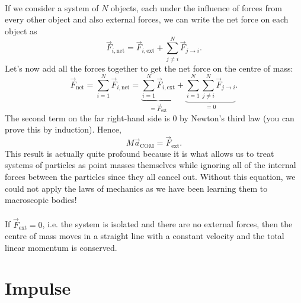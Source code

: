 \documentclass[../classical_mechanics.tex]{subfiles}
\begin{document}
        \paragraph{}
        If we consider a system of $N$ objects, each under the influence of forces from every other object and also external forces, we can write the net force on each object as
        \begin{equation}
            \vec{F}_{i,\text{net}}=\vec{F}_{i,\text{ext}}+\sum_{j\neq i}^N\vec{F}_{j\to i}.
        \end{equation}
        Let's now add all the forces together to get the net force on the centre of mass:
        \begin{equation}
            \vec{F}_\text{net} = \sum_{i=1}^N\vec{F}_{i,\text{net}} = \underbrace{\sum_{i=1}^N\vec{F}_{i,\text{ext}}}_{=\vec{F}_\text{ext}}+\underbrace{\sum_{i=1}^N\sum_{j\neq i}^N\vec{F}_{j\to i}}_{=0}.
        \end{equation}
        The second term on the far right-hand side is 0 by Newton's third law (you can prove this by induction).
        Hence,
        \begin{equation}\label{eq-NII-macroscopic}
            M\vec{a}_\text{COM}=\vec{F}_\text{ext}.
        \end{equation}
        This result is actually quite profound because it is what allows us to treat systems of particles as point masses themselves while ignoring all of the internal forces between the particles since they all cancel out.
        Without this equation, we could not apply the laws of mechanics as we have been learning them to macroscopic bodies!
        
        \paragraph{}
        If $\vec{F}_\text{ext}=0$, i.e. the system is isolated and there are no external forces, then the centre of mass moves in a straight line with a constant velocity and the total linear momentum is conserved.

    \section{Impulse}
\end{document}
